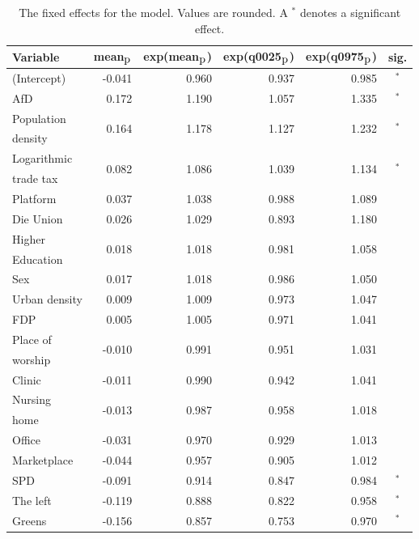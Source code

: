 \begin{table}[H]
\caption{The fixed effects for the model. Values are rounded. A $^*$ denotes a significant effect. \label{FixedAllGermany_nospatial}}
\begin{tabular}{l r r r r c}
\toprule
\textbf{Variable}	& \textbf{mean$_{\hbox{p}}$}	& \textbf{exp(mean$_{\hbox{p}}$)} & \textbf{exp(q0025$_{\hbox{p}}$)} & \textbf{exp(q0975$_{\hbox{p}}$)} & \textbf{sig.}\\
\midrule
(Intercept) & -0.041 & 0.960 & 0.937 & 0.985 & $^*$\\
AfD & 0.172 & 1.190 & 1.057 & 1.335 & $^*$\\
Population & \multirow{2}{*}{0.164} & \multirow{2}{*}{1.178} & \multirow{2}{*}{1.127} & \multirow{2}{*}{1.232} & \multirow{2}{*}{$^*$}\\
density \\
Logarithmic & \multirow{2}{*}{0.082} & \multirow{2}{*}{1.086} & \multirow{2}{*}{1.039} & \multirow{2}{*}{1.134} & \multirow{2}{*}{$^*$}\\
trade tax \\
Platform & 0.037 & 1.038 & 0.988 & 1.089 \\
Die Union & 0.026 & 1.029 & 0.893 & 1.180\\
Higher & \multirow{2}{*}{0.018} & \multirow{2}{*}{1.018} & \multirow{2}{*}{0.981} & \multirow{2}{*}{1.058} \\
Education\\
Sex & 0.017 & 1.018 & 0.986 & 1.050 & \\
Urban density & 0.009 & 1.009 & 0.973 & 1.047 \\
FDP & 0.005 & 1.005 & 0.971 & 1.041 \\
Place of & \multirow{2}{*}{-0.010} & \multirow{2}{*}{0.991} & \multirow{2}{*}{0.951} & \multirow{2}{*}{1.031} \\
worship\\
Clinic & -0.011 & 0.990 & 0.942 & 1.041 \\
Nursing & \multirow{2}{*}{-0.013} & \multirow{2}{*}{0.987} & \multirow{2}{*}{0.958} & \multirow{2}{*}{1.018} \\
home\\
Office & -0.031 & 0.970 & 0.929 & 1.013 \\
Marketplace & -0.044 & 0.957 & 0.905 & 1.012 \\
SPD & -0.091 & 0.914 & 0.847 & 0.984 & $^*$\\
The left & -0.119 & 0.888 & 0.822 & 0.958 & $^*$\\
Greens & -0.156 & 0.857 & 0.753 & 0.970 & $^*$\\
\bottomrule
\end{tabular}
\end{table}
